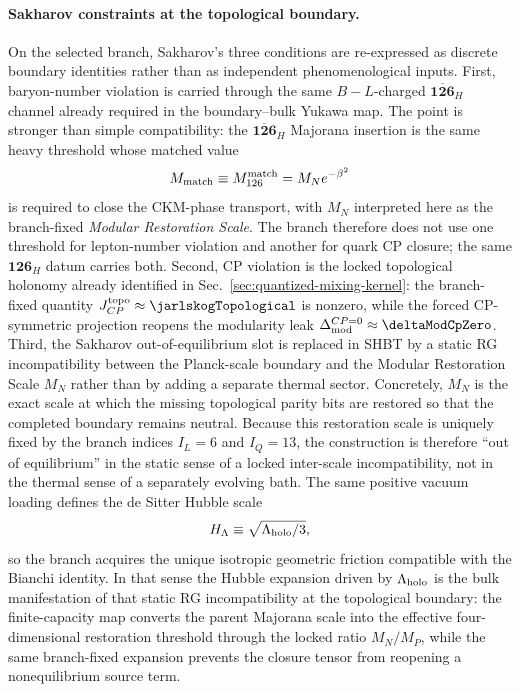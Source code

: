 \documentclass[11pt]{article}
\begin{document}
\paragraph{Sakharov constraints at the topological boundary.}
On the selected branch, Sakharov's three conditions are re-expressed as discrete
boundary identities rather than as independent phenomenological inputs.
First, baryon-number violation is carried through the same
$B-L$-charged $\overline{\mathbf{126}}_H$ channel already required in the
boundary--bulk Yukawa map. The point is stronger than simple compatibility:
the $\overline{\mathbf{126}}_H$ Majorana insertion is the same heavy threshold
whose matched value
\begin{equation}
 M_{\rm match}\equiv M_{126}^{\rm match}=M_Ne^{-\beta^2}
\end{equation}
is required to close the CKM-phase transport, with $M_N$ interpreted here as
the branch-fixed \emph{Modular Restoration Scale}. The branch therefore does not use
one threshold for lepton-number violation and another for quark CP closure; the
same $\mathbf{126}_H$ datum carries both. Second, CP violation is the locked
topological holonomy already identified in Sec.~\ref{sec:quantized-mixing-kernel}:
the branch-fixed quantity $J_{CP}^{\rm topo}\approx\jarlskogTopological$ is
nonzero, while the forced CP-symmetric projection reopens the modularity leak
$\Delta_{\rm mod}^{CP=0}\approx\deltaModCpZero$. Third, the Sakharov
out-of-equilibrium slot is replaced in SHBT by a static RG incompatibility
between the Planck-scale boundary and the Modular Restoration Scale $M_N$
rather than by adding a separate thermal sector. Concretely, $M_N$ is the
exact scale at which the missing topological parity bits are restored so that
the completed boundary remains neutral. Because this restoration scale is
uniquely fixed by the branch indices $I_L=6$ and $I_Q=13$, the construction is
therefore ``out of equilibrium'' in the static sense of a locked inter-scale
incompatibility, not in the thermal sense of a separately evolving bath. The
same positive vacuum loading defines the de Sitter Hubble scale
\begin{equation}
 H_{\Lambda}\equiv\sqrt{\Lambda_{\rm holo}/3},
\end{equation}
so the branch acquires the unique isotropic geometric friction compatible with
the Bianchi identity. In that sense the Hubble expansion driven by
$\Lambda_{\rm holo}$ is the bulk manifestation of that static RG
incompatibility at the topological boundary: the finite-capacity map converts
the parent Majorana scale into the effective four-dimensional restoration threshold
through the locked ratio $M_N/M_P$, while the same branch-fixed expansion
prevents the closure tensor from reopening a nonequilibrium source term.
\end{document}
